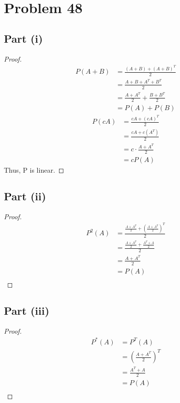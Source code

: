 \documentclass{article}
\begin{document}
\section*{Problem 48}

\subsection*{Part (i)}

\begin{proof}
\begin{align*}
P(A + B) &= \frac{(A + B) + (A + B)^{T}}{2} \\
&=  \frac{A + B + A^{T} + B^{T}}{2} \\
&= \frac{A + A^{T}}{2} + \frac{B + B^{T}}{2} \\
&= P(A) + P(B)
\end{align*}
\begin{align*}
P(cA) &= \frac{cA + (cA)^{T}}{2} \\
&=  \frac{cA + c(A^{T})}{2} \\
&= c \cdot \frac{A + A^{T}}{2} \\
&= cP(A)
\end{align*}
Thus, P is linear.
\end{proof}

\subsection*{Part (ii)}

\begin{proof}
\begin{align*}
P^{2}(A) &= \frac{\frac{A + A^{T}}{2} + (\frac{A + A^{T}}{2})^{T}}{2} \\
&= \frac{\frac{A + A^{T}}{2} + \frac{A^{T} + A}{2}}{2} \\
&= \frac{A + A^{T}}{2} \\
&= P(A) \\
\end{align*}
\end{proof}

\subsection*{Part (iii)}

\begin{proof}
\begin{align*}
P^{*}(A) &= P^{T}(A) \\
&= (\frac{A + A^{T}}{2})^{T} \\
&= \frac{A^{T} + A}{2} \\
&= P(A) \\
\end{align*}
\end{proof}
\end{document}
